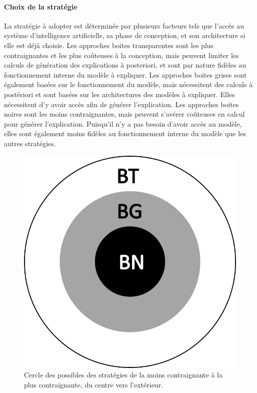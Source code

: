 \paragraph{Choix de la stratégie}
La stratégie à adopter est déterminée par plusieurs facteurs tels que l'accès au système d'intelligence artificielle, sa phase de conception, et son architecture si elle est déjà choisie.
Les approches boites transparentes sont les plus contraignantes et les plus coûteuses à la conception, mais peuvent limiter les calculs de génération des explications à posteriori, et sont par nature fidèles au fonctionnement interne du modèle à expliquer.
Les approches boites grises sont également basées sur le fonctionnement du modèle, mais nécessitent des calculs à postériori et sont basées sur les architectures des modèles à expliquer. Elles nécessitent d'y avoir accès afin de générer l'explication.
Les approches boites noires sont les moins contraignantes, mais peuvent s'avérer coûteuses en calcul pour générer l'explication. Puisqu'il n'y a pas besoin d'avoir accès au modèle, elles sont également moins fidèles au fonctionnement interne du modèle que les autres stratégies.

\begin{figure}[htpb!]
    \centering
    \includegraphics[scale=0.22]{S5-Presentation_du_template_nlp/figures/guide_strat2.png}
    \caption{Cercle des possibles des stratégies de la moins contraignante à la plus contraignante, du centre vers l'extérieur.}
    \label{fig:guide_strat2}
\end{figure}

